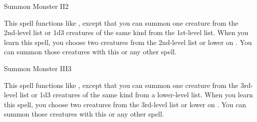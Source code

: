 \begin{spellsection}{Summon Monster II}{2}
    \begin{spellheader}
    \end{spellheader}
    \begin{spellcontent}
        \begin{spelltargetinginfo}
        \end{spelltargetinginfo}
        \begin{spelleffects}
            \spellspecial This spell functions like , except that you can summon one creature from the 2nd-level list or 1d3 creatures of the same kind from the 1st-level list. When you learn this spell, you choose two creatures from the 2nd-level list or lower on . You can summon those creatures with this or any other  spell.
            \spelldur \durshort \dismissable
        \end{spelleffects}
    \end{spellcontent}
    \begin{spellfooter}
        \miscastexplode
    \end{spellfooter}
\end{spellsection}

\begin{spellsection}{Summon Monster III}{3}
    \begin{spellheader}
    \end{spellheader}
    \begin{spellcontent}
        \begin{spelltargetinginfo}
        \end{spelltargetinginfo}
        \begin{spelleffects}
            \spellspecial This spell functions like , except that you can summon one creature from the 3rd-level list or 1d3 creatures of the same kind from a lower-level list. When you learn this spell, you choose two creatures from the 3rd-level list or lower on . You can summon those creatures with this or any other  spell.
            \spelldur \durshort \dismissable
        \end{spelleffects}
    \end{spellcontent}
    \begin{spellfooter}
        \miscastexplode
    \end{spellfooter}
\end{spellsection}

